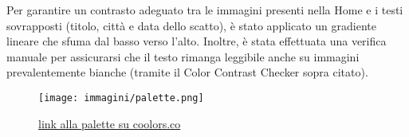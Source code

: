 Per garantire un contrasto adeguato tra le immagini presenti nella Home e i testi sovrapposti (titolo, città e data dello scatto), è stato applicato un gradiente lineare che sfuma dal basso verso l'alto. Inoltre, è stata effettuata una verifica manuale per assicurarsi che il testo rimanga leggibile anche su immagini prevalentemente bianche (tramite il Color Contrast Checker sopra citato).

\begin{figure}[h]
    \centering
    \texttt{[image: immagini/palette.png]}
    \caption{\href{https://coolors.co/030303-fefefe-f78e69-23b5d3}{link alla palette su coolors.co}}
    \label{fig:palette}
\end{figure}